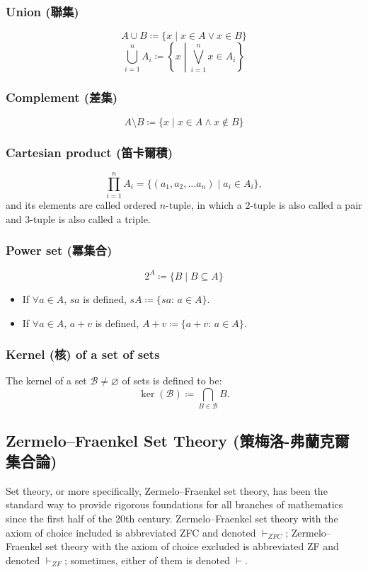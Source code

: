 \documentclass[a4paper,12pt]{article}
\begin{document}
\subsubsection{Union (聯集)}
\[A\cup B\coloneq\{x\mid x\in A \lor x\in B\}\]
\[\bigcup_{i=1}^n A_i\coloneq\left\{x\middle | \bigvee_{i=1}^n x\in A_i\right\}\]
\subsubsection{Complement (差集)}
\[A\setminus B\coloneq\{x\mid x\in A \land x\notin B\}\]
\subsubsection{Cartesian product (笛卡爾積)}
\[\prod_{i=1}^nA_i=\{(a_1,a_2,\ldots a_n)\mid a_i\in A_i\},\]
and its elements are called ordered $n$-tuple, in which a $2$-tuple is also called a pair and $3$-tuple is also called a triple.
\subsubsection{Power set (冪集合)}
\[2^A\coloneq\{B\mid B\subseteq A\}\]
\begin{itemize}
\item If $\forall a\in A$, $sa$ is defined, $sA\coloneq\{sa:\,a\in A\}$.
\item If $\forall a\in A$, $a+v$ is defined, $A+v\coloneq\{a+v:\,a\in A\}$.
\end{itemize}
\subsubsection{Kernel (核) of a set of sets}
The kernel of a set $\mathcal {B}\neq \varnothing$ of sets is defined to be:
\[\ker(\mathcal {B})\coloneq\bigcap_{B\in\mathcal {B}}B.\]
\subsection{Zermelo–Fraenkel Set Theory (策梅洛-弗蘭克爾集合論)}
Set theory, or more specifically, Zermelo–Fraenkel set theory, has been the standard way to provide rigorous foundations for all branches of mathematics since the first half of the 20th century. Zermelo–Fraenkel set theory with the axiom of choice included is abbreviated ZFC and denoted $\vdash_{ZFC}$; Zermelo–Fraenkel set theory with the axiom of choice excluded is abbreviated ZF and denoted $\vdash_{ZF}$; sometimes, either of them is denoted $\vdash$.
\end{document}
